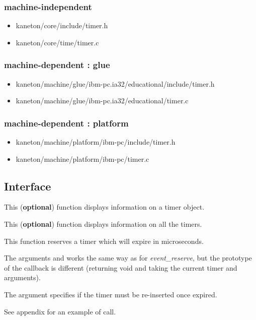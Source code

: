 \subsubsection{\color{filerefcolor} machine-independent}
\begin{itemize}
\item kaneton/core/include/timer.h
\item kaneton/core/time/timer.c
\end{itemize}

\subsubsection{\color{filerefcolor} machine-dependent : glue}
\begin{itemize}
\item kaneton/machine/glue/ibm-pc.ia32/educational/include/timer.h
\item kaneton/machine/glue/ibm-pc.ia32/educational/timer.c
\end{itemize}

\subsubsection{\color{filerefcolor} machine-dependent : platform}
\begin{itemize}
\item kaneton/machine/platform/ibm-pc/include/timer.h
\item kaneton/machine/platform/ibm-pc/timer.c
\end{itemize}

\newpage
\subsection*{Interface}

	 {
	   This (\textbf{optional}) function displays information on a
	   timer object.
	 }

	 {
	   This (\textbf{optional}) function displays information on
	   all the timers.
	 }

	 {
	   This function reserves a timer which will expire in
	    microseconds.

	   The arguments  and  works
	   the same way as for \emph{event\_reserve}, but the
	   prototype of the callback is different (returning void and
	   taking the current timer  and 
	   arguments).

	   The  argument specifies if the timer
	   must be re-inserted once expired.

	   See appendix for an example of call.
	 }

